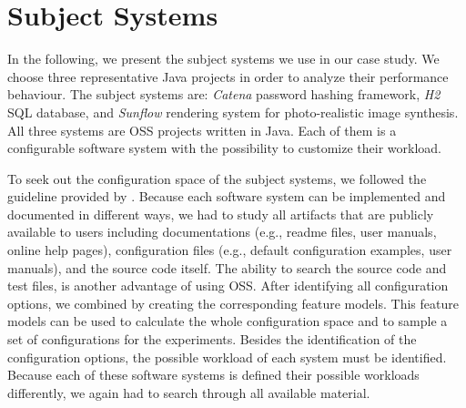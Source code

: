

\section{Subject Systems}
\label{subject_systems}

In the following, we present the subject systems we use in our case study. We choose three representative Java projects in order to analyze their performance behaviour. The subject systems are: \textit{Catena} password hashing framework, \textit{H2} SQL database, and \textit{Sunflow} rendering system for photo-realistic image synthesis. All three systems are \ac{OSS} projects written in Java. Each of them is a configurable software system with the possibility to customize their workload. 

To seek out the configuration space of the subject systems, we followed the guideline provided by \cite{Han:2016:ESP:2961111.2962602}. Because each software system can be implemented and documented in different ways, we had to study all artifacts that are publicly available to users including documentations (e.g., readme files, user manuals, online help pages), configuration files (e.g., default configuration examples, user manuals), and the source code itself. The ability to search the source code and test files, is another advantage of using \ac{OSS}. After identifying all configuration options, we combined by creating the corresponding feature models. This feature models can be used to calculate the whole configuration space and to sample a set of configurations for the experiments. Besides the identification of the configuration options, the possible workload of each system must be identified. Because each of these software systems is defined their possible workloads differently, we again had to search through all available material. 


% 

